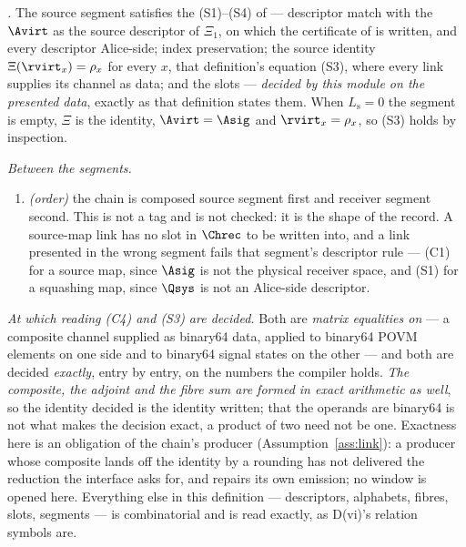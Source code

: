 \begin{definition}
\emph{.} The source segment satisfies the
 (S1)--(S4) of
 --- descriptor match with the
 $\Avirt$ as the source descriptor of
$\Xi_1$, on which the certificate of  is
written, and every descriptor Alice-side; index preservation; the source
identity $\Xi(\rvirt_x)=\rho_x$ for every $x$, that definition's equation
(S3), where every link supplies its channel as data; and the slots ---
\emph{decided by this module on the presented data}, exactly as that
definition states them. When $L_{\mathrm s}=0$ the segment is empty, $\Xi$ is
the identity, $\Avirt=\Asig$ and $\rvirt_x=\rho_x$, so (S3) holds by
inspection.

\emph{Between the segments.}
\begin{enumerate}[label=(X\arabic*),leftmargin=3.0em]
\item \emph{(order)} the chain is composed source segment first and receiver
segment second. This is not a tag and is not checked: it is the shape of the
record. A source-map link has no slot in $\Chrec$ to be written into, and a
link presented in the wrong segment fails that segment's descriptor rule ---
(C1) for a source map, since $\Asig$ is not the physical receiver space, and
(S1) for a squashing map, since $\Qsys$ is not an Alice-side descriptor.
\end{enumerate}

\emph{At which reading (C4) and (S3) are decided.} Both are \emph{matrix
equalities on } --- a composite channel supplied as
binary64 data, applied to binary64 POVM elements on one side and to binary64
signal states on the other --- and both are decided \emph{exactly}, entry by
entry, on the numbers the compiler holds. \emph{The composite, the adjoint
and the fibre sum are formed in exact arithmetic as well}, so the identity
decided is the identity written; that
the operands are binary64 is not what makes the decision exact, a product of
two  need not be one. Exactness here is an obligation of
the chain's producer (Assumption~\ref{ass:link}): a producer whose composite
lands off the identity by a rounding has not delivered the reduction the
interface asks for, and repairs its own emission; no window is opened here. Everything else
in this definition --- descriptors, alphabets, fibres, slots, segments --- is
combinatorial and is read exactly, as D(vi)'s relation symbols are.


\end{definition}
